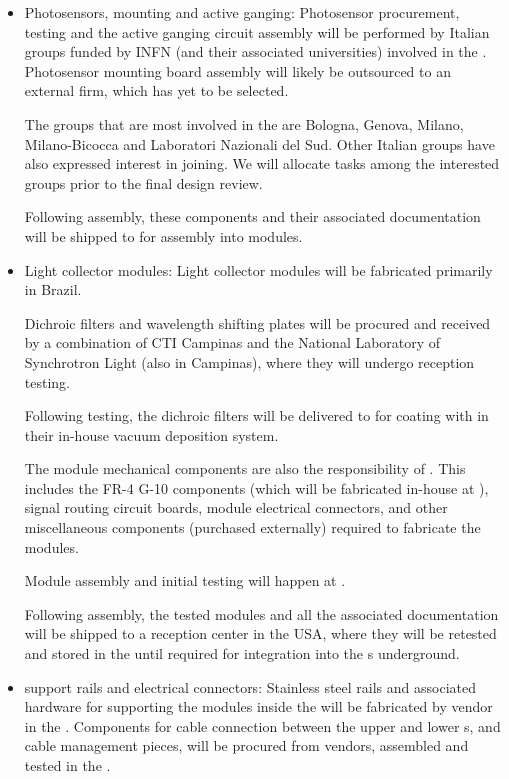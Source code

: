 \begin{itemize}

\item Photosensors, mounting and active ganging:  Photosensor procurement, testing and the active ganging circuit assembly will be performed by Italian groups funded by INFN (and their associated universities) involved in the . Photosensor mounting board assembly will likely be outsourced to an external firm, which has yet to be selected.

The groups that are most involved in the  are Bologna, Genova, Milano, Milano-Bicocca and Laboratori Nazionali del Sud.  Other Italian groups have also expressed interest in joining.  We will allocate tasks among the interested groups prior to the final design review.

Following assembly, these components and their associated  documentation will be shipped to  for assembly into  modules.

\item Light collector modules:  Light collector modules will be fabricated primarily in Brazil.  

Dichroic filters and wavelength shifting plates will be procured and received by a combination of CTI Campinas and the National Laboratory of Synchrotron Light (also in Campinas), where they will undergo reception  testing.

Following testing, the dichroic filters will be delivered to  for coating with  in their in-house vacuum deposition system.

The module mechanical components are also the responsibility of .  This includes the FR-4 G-10 components (which will be fabricated in-house at ), signal routing circuit boards, module electrical connectors, and other miscellaneous components (purchased externally) required to fabricate the modules.

Module assembly and initial  testing will happen at .

Following assembly, the tested modules and all the associated  documentation will be shipped to a reception center in the USA, where they will be retested and stored in the  until required for integration into the s underground.


\item {} support rails and electrical connectors:  Stainless steel rails and associated hardware for supporting the  modules inside the  will be fabricated by vendor in the .  Components for cable connection between the upper and lower s, and cable management pieces, will be procured from vendors, assembled and tested in the .  


\end{itemize}
